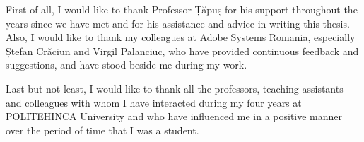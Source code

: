 \documentclass[a4paper,5pt]{thesis.cs.pub.ro}
\begin{document}
\author{Andrei-Bogdan Pârvu}
\date{July 2014}




\begin{acknowledgements}
\vspace*{7cm}
\begin{center}
\parbox{10cm}{First of all, I would like to thank Professor Țăpuș for his support throughout the years since we have met and for his assistance and advice in writing this thesis. Also, I would like to thank my colleagues at Adobe Systems Romania, especially Ștefan Crăciun and Virgil Palanciuc, who have provided continuous feedback and suggestions, and have stood beside me during my work.}
\end{center}
\vspace{0.3cm}
\begin{center}
\parbox{10cm}{Last but not least, I would like to thank all the professors, teaching assistants and colleagues with whom I have interacted during my four years at POLITEHINCA University and who have influenced me in a positive manner over the period of time that I was a student.}
\end{center}
\end{acknowledgements}
\end{document}
